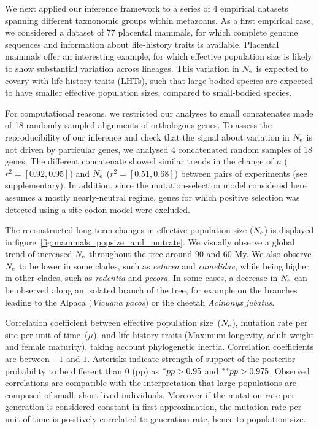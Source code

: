 \documentclass{MBE}
\begin{document}
	We next applied our inference framework to a series of 4 empirical datasets spanning different taxnonomic groups within metazoans.
	As a first empirical case, we considered a dataset of 77 placental mammals, for which complete genome sequences and information about life-history traits is available.
	Placental mammals offer an interesting example, for which {effective population size} is likely to show substantial variation across lineages.
	This variation in $N_{\text{e}}$ is expected to covary with life-history traits ({LHT}s), such that large-bodied species are expected to have smaller effective population sizes, compared to small-bodied species.

	For computational reasons, we restricted our analyses to small concatenates made of 18 randomly sampled alignments of orthologous genes.
	To assess the reproducibility of our inference and check that the signal about variation in $N_{\text{e}}$ is not driven by particular genes, we analysed 4 concatenated random samples of 18 genes.
	The different concatenate showed similar trends in the change of $\mu$ ($r^2=[0.92,0.95]$) and $N_{\text{e}}$ ($r^2=[0.51,0.68]$) between pairs of experiments (see supplementary).
	In addition, since the mutation-selection model considered here assumes a mostly {nearly-neutral} regime, genes for which positive selection was detected using a site {codon} model were excluded.

	The reconstructed long-term changes in {effective population size} ($N_{\text{e}}$) is displayed in figure~\ref{fig:mammals_popsize_and_mutrate}.
	We visually observe a global trend of increased $N_{\text{e}}$ throughout the tree around 90 and 60 My.
	We also observe $N_{\text{e}}$ to be lower in some clades, such as \textit{cetacea} and \textit{camelidae}, while being higher in other clades, such as \textit{rodentia} and \textit{pecora}.
	In some cases, a decrease in $N_{\text{e}}$ can be observed along an isolated branch of the tree, for example on the branches leading to the Alpaca (\textit{Vicugna pacos}) or the cheetah \textit{Acinonyx jubatus}.

	\begin{table}[ht]
		
		\caption[Traits correlation in mammals]{
		Correlation coefficient between effective population size~($N_{\text{e}}$), mutation rate per site per unit of time~($\mu$), and life-history traits (Maximum longevity, adult weight and female maturity), taking account phylogenetic inertia.
		Correlation coefficients are between $-1$ and $1$.
		Asterisks indicate strength of support of the {posterior} probability to be different than $0$ (pp) as $\smash{^{*}} pp > 0.95$ and $\smash{^{**}} pp > 0.975$.
		Observed correlations are compatible with the interpretation that large populations are composed of small, short-lived individuals.
		Moreover if the mutation rate per generation is considered constant in first approximation, the mutation rate per unit of time is positively correlated to generation rate, hence to population size.
		}
		\label{tab:mammals_correlation}
	\end{table}
\end{document}
